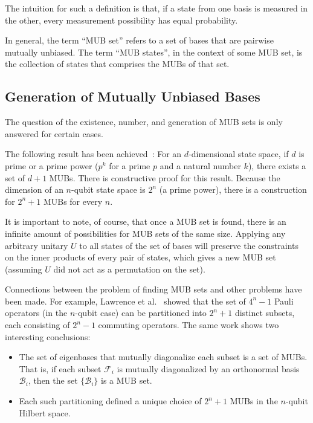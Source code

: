 \documentclass[a4paper,12pt]{article}
\newcommand{\base}{\mathcal{B}}
\begin{document}
The intuition for such a definition is that, if a state from one basis is measured in the other, every measurement possibility has equal probability.

In general, the term ``MUB set'' refers to a set of bases that are pairwise mutually unbiased.
The term ``MUB states'', in the context of some MUB set, is the collection of states that comprises the MUBs of that set.

\subsection{Generation of Mutually Unbiased Bases} \label{subsec:mub_gen}
The question of the existence, number, and generation of MUB sets is only answered for certain cases.

The following result has been achieved~\cite{bandyopadhyay_new_2002}:
For an $d$-dimensional state space, if $d$ is prime or a prime power ($p^k$ for a prime $p$ and a natural number $k$), there exists a set of $d+1$ MUBs.
There is constructive proof for this result.
Because the dimension of an $n$-qubit state space is $2^n$ (a prime power), there is a construction for $2^n+1$ MUBs for every $n$.

It is important to note, of course, that once a MUB set is found, there is an infinite amount of possibilities for MUB sets of the same size. Applying any arbitrary unitary $U$ to all states of the set of bases will preserve the constraints on the inner products of every pair of states, which gives a new MUB set (assuming $U$ did not act as a permutation on the set).

Connections between the problem of finding MUB sets and other problems have been made. For example, Lawrence et al.~\cite{lawrence_mutually_2002} showed that the set of $4^n-1$ Pauli operators (in the $n$-qubit case) can be partitioned into $2^n+1$ distinct subsets, each consisting of $2^n-1$ commuting operators. The same work shows two interesting conclusions:
\begin{itemize}
    \item The set of eigenbases that mutually diagonalize each subset is a set of MUBs.
    That is, if each subset $\mathcal{F}_i$ is mutually diagonalized by an orthonormal basis $\base_i$, then the set $\{\base_i\}$ is a MUB set.
    \item Each such partitioning defined a unique choice of $2^n+1$ MUBs in the $n$-qubit Hilbert space.
\end{itemize}
\end{document}
